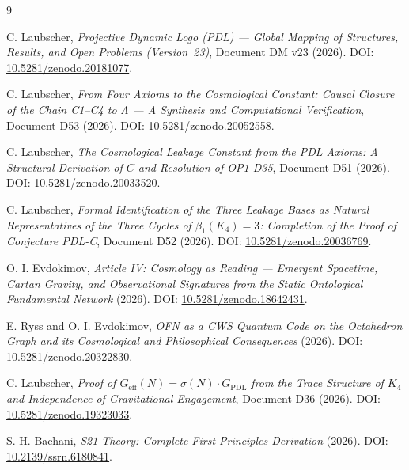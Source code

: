 \documentclass[11pt,a4paper]{article}
\begin{document}

\begin{thebibliography}{9}

C. Laubscher, \emph{Projective Dynamic Logo (PDL) --- Global Mapping of
Structures, Results, and Open Problems (Version~23)}, Document DM v23 (2026).
\newblock DOI: \href{https://doi.org/10.5281/zenodo.20181077}{10.5281/zenodo.20181077}.

C. Laubscher, \emph{From Four Axioms to the Cosmological Constant: Causal
Closure of the Chain C1--C4 to $\Lambda$ --- A Synthesis and Computational
Verification}, Document D53 (2026).
\newblock DOI: \href{https://doi.org/10.5281/zenodo.20052558}{10.5281/zenodo.20052558}.

C. Laubscher, \emph{The Cosmological Leakage Constant from the PDL Axioms:
A Structural Derivation of $C$ and Resolution of OP1-D35}, Document D51 (2026).
\newblock DOI: \href{https://doi.org/10.5281/zenodo.20033520}{10.5281/zenodo.20033520}.

C. Laubscher, \emph{Formal Identification of the Three Leakage Bases as Natural
Representatives of the Three Cycles of $\beta_1(K_4)=3$: Completion of the
Proof of Conjecture PDL-C}, Document D52 (2026).
\newblock DOI: \href{https://doi.org/10.5281/zenodo.20036769}{10.5281/zenodo.20036769}.

O. I. Evdokimov, \emph{Article IV: Cosmology as Reading --- Emergent Spacetime,
Cartan Gravity, and Observational Signatures from the Static Ontological
Fundamental Network} (2026).
\newblock DOI: \href{https://doi.org/10.5281/zenodo.18642431}{10.5281/zenodo.18642431}.

E. Ryss and O. I. Evdokimov, \emph{OFN as a CWS Quantum Code on the Octahedron
Graph and its Cosmological and Philosophical Consequences} (2026).
\newblock DOI: \href{https://doi.org/10.5281/zenodo.20322830}{10.5281/zenodo.20322830}.

C. Laubscher, \emph{Proof of $G_{\mathrm{eff}}(N) = \sigma(N) \cdot G_{\mathrm{PDL}}$
from the Trace Structure of $K_4$ and Independence of Gravitational Engagement},
Document D36 (2026).
\newblock DOI: \href{https://doi.org/10.5281/zenodo.19323033}{10.5281/zenodo.19323033}.

S. H. Bachani, \emph{S21 Theory: Complete First-Principles Derivation} (2026).
\newblock DOI: \href{https://doi.org/10.2139/ssrn.6180841}{10.2139/ssrn.6180841}.

\end{thebibliography}
\end{document}
